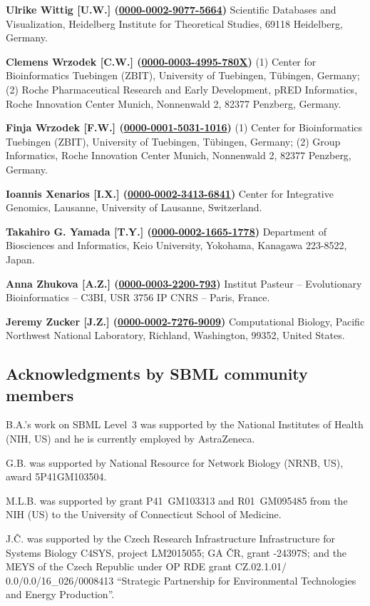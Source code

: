 \documentclass{sbml-paper}
\newcommand{\orcid}[1]{\href{https://orcid.org/#1}{#1}}
\begin{document}
\textbf{Ulrike Wittig [U.W.] (\orcid{0000-0002-9077-5664})} Scientific Databases and Visualization, Heidelberg Institute for Theoretical Studies, 69118 Heidelberg, Germany.

\textbf{Clemens Wrzodek [C.W.] (\orcid{0000-0003-4995-780X})} (1) Center for Bioinformatics Tuebingen (ZBIT), University of Tuebingen, Tübingen, Germany; (2) Roche Pharmaceutical Research and Early Development, pRED Informatics, Roche Innovation Center Munich, Nonnenwald 2, 82377 Penzberg, Germany.

\textbf{Finja Wrzodek [F.W.] (\orcid{0000-0001-5031-1016})} (1) Center for Bioinformatics Tuebingen (ZBIT), University of Tuebingen, Tübingen, Germany; (2) Group Informatics, Roche Innovation Center Munich, Nonnenwald 2, 82377 Penzberg, Germany.

\textbf{Ioannis Xenarios [I.X.] (\orcid{0000-0002-3413-6841})} Center for Integrative Genomics, Lausanne, University of Lausanne, Switzerland.

\textbf{Takahiro G. Yamada [T.Y.] (\orcid{0000-0002-1665-1778})} Department of Biosciences and Informatics, Keio University, Yokohama, Kanagawa 223-8522, Japan.

\textbf{Anna Zhukova [A.Z.] (\orcid{0000-0003-2200-793})} Institut Pasteur – Evolutionary Bioinformatics – C3BI, USR 3756 IP CNRS – Paris, France.

\textbf{Jeremy Zucker [J.Z.] (\orcid{0000-0002-7276-9009})} Computational Biology, Pacific Northwest National Laboratory, Richland, Washington, 99352, United States.


\clearpage
\subsection{Acknowledgments by SBML community members}

B.A.'s work on SBML Level~3 was supported by the National Institutes of Health (NIH, US) and he is currently employed by AstraZeneca.

G.B. was supported by National Resource for Network Biology (NRNB, US), award \No 5P41GM103504.

M.L.B. was supported by grant \No P41~GM103313 and R01~GM095485 from the NIH (US) to the University of Connecticut School of Medicine.

J.Č. was supported by the Czech Research Infrastructure Infrastructure for Systems Biology C4SYS, project \No LM2015055; GA ČR, grant -24397S; and the MEYS of the Czech Republic under OP RDE grant \No CZ.02.1.01/ 0.0/0.0/16\_026/0008413 ``Strategic Partnership for Environmental Technologies and Energy Production''.
\end{document}
